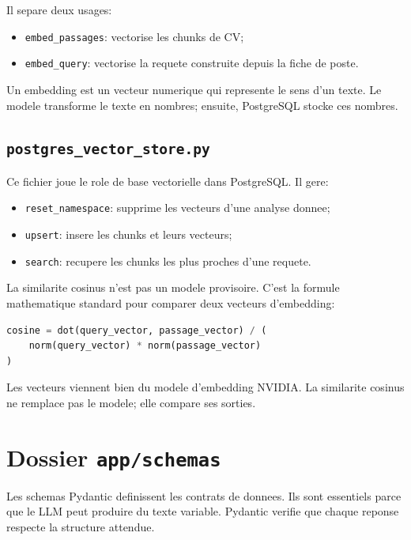 \documentclass[12pt,a4paper]{article}
\begin{document}
Il separe deux usages:

\begin{itemize}
  \item \texttt{embed\_passages}: vectorise les chunks de CV;
  \item \texttt{embed\_query}: vectorise la requete construite depuis la fiche de poste.
\end{itemize}

Un embedding est un vecteur numerique qui represente le sens d'un texte. Le modele transforme le texte en nombres; ensuite, PostgreSQL stocke ces nombres.

\subsection{\texttt{postgres\_vector\_store.py}}

Ce fichier joue le role de base vectorielle dans PostgreSQL. Il gere:

\begin{itemize}
  \item \texttt{reset\_namespace}: supprime les vecteurs d'une analyse donnee;
  \item \texttt{upsert}: insere les chunks et leurs vecteurs;
  \item \texttt{search}: recupere les chunks les plus proches d'une requete.
\end{itemize}

La similarite cosinus n'est pas un modele provisoire. C'est la formule mathematique standard pour comparer deux vecteurs d'embedding:

\begin{lstlisting}[style=smartcode,language=Python]
cosine = dot(query_vector, passage_vector) / (
    norm(query_vector) * norm(passage_vector)
)
\end{lstlisting}

Les vecteurs viennent bien du modele d'embedding NVIDIA. La similarite cosinus ne remplace pas le modele; elle compare ses sorties.

\section{Dossier \texttt{app/schemas}}

Les schemas Pydantic definissent les contrats de donnees. Ils sont essentiels parce que le LLM peut produire du texte variable. Pydantic verifie que chaque reponse respecte la structure attendue.
\end{document}
